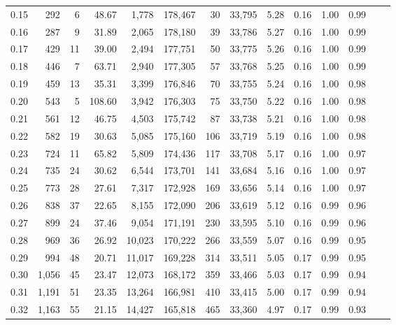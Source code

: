 \begin{tabular}{rrrrrrrrrrrrrr}
0.15 &    292 &    6 &   48.67 &    1,778 &  178,467 &      30 &  33,795 &  5.28 &  0.16 &  1.00 &      0.99 \\
0.16 &    287 &    9 &   31.89 &    2,065 &  178,180 &      39 &  33,786 &  5.27 &  0.16 &  1.00 &      0.99 \\
0.17 &    429 &   11 &   39.00 &    2,494 &  177,751 &      50 &  33,775 &  5.26 &  0.16 &  1.00 &      0.99 \\
0.18 &    446 &    7 &   63.71 &    2,940 &  177,305 &      57 &  33,768 &  5.25 &  0.16 &  1.00 &      0.99 \\
0.19 &    459 &   13 &   35.31 &    3,399 &  176,846 &      70 &  33,755 &  5.24 &  0.16 &  1.00 &      0.98 \\
0.20 &    543 &    5 &  108.60 &    3,942 &  176,303 &      75 &  33,750 &  5.22 &  0.16 &  1.00 &      0.98 \\
0.21 &    561 &   12 &   46.75 &    4,503 &  175,742 &      87 &  33,738 &  5.21 &  0.16 &  1.00 &      0.98 \\
0.22 &    582 &   19 &   30.63 &    5,085 &  175,160 &     106 &  33,719 &  5.19 &  0.16 &  1.00 &      0.98 \\
0.23 &    724 &   11 &   65.82 &    5,809 &  174,436 &     117 &  33,708 &  5.17 &  0.16 &  1.00 &      0.97 \\
0.24 &    735 &   24 &   30.62 &    6,544 &  173,701 &     141 &  33,684 &  5.16 &  0.16 &  1.00 &      0.97 \\
0.25 &    773 &   28 &   27.61 &    7,317 &  172,928 &     169 &  33,656 &  5.14 &  0.16 &  1.00 &      0.97 \\
0.26 &    838 &   37 &   22.65 &    8,155 &  172,090 &     206 &  33,619 &  5.12 &  0.16 &  0.99 &      0.96 \\
0.27 &    899 &   24 &   37.46 &    9,054 &  171,191 &     230 &  33,595 &  5.10 &  0.16 &  0.99 &      0.96 \\
0.28 &    969 &   36 &   26.92 &   10,023 &  170,222 &     266 &  33,559 &  5.07 &  0.16 &  0.99 &      0.95 \\
0.29 &    994 &   48 &   20.71 &   11,017 &  169,228 &     314 &  33,511 &  5.05 &  0.17 &  0.99 &      0.95 \\
0.30 &  1,056 &   45 &   23.47 &   12,073 &  168,172 &     359 &  33,466 &  5.03 &  0.17 &  0.99 &      0.94 \\
0.31 &  1,191 &   51 &   23.35 &   13,264 &  166,981 &     410 &  33,415 &  5.00 &  0.17 &  0.99 &      0.94 \\
0.32 &  1,163 &   55 &   21.15 &   14,427 &  165,818 &     465 &  33,360 &  4.97 &  0.17 &  0.99 &      0.93 \\

\end{tabular}
